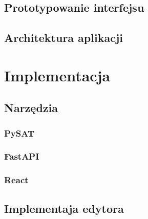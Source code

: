 \documentclass[a4paper,12pt,oneside]{book}
\theoremstyle{definition}
\begin{document}
\section{Prototypowanie interfejsu}

\lipsum[1]

\lipsum[2]

\lipsum[3]

\section{Architektura aplikacji}

\lipsum[1]

\lipsum[2]

\lipsum[3]

\chapter{Implementacja}

\section{Narzędzia}

\subsection{PySAT}

\lipsum[1]

\lipsum[2]

\lipsum[3]

\subsection{FastAPI}

\lipsum[1]

\lipsum[2]

\lipsum[3]

\subsection{React}

\lipsum[1]

\lipsum[2]

\lipsum[3]

\section{Implementaja edytora}

\lipsum[1]
\end{document}
